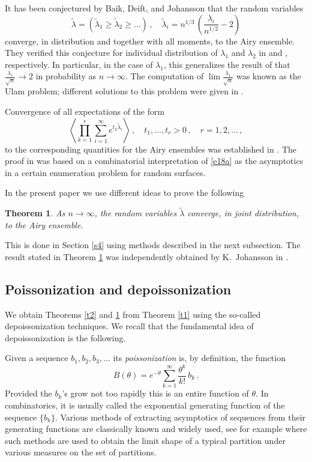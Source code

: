 \documentclass[12pt]{amsart}
\newcommand{\la}{\lambda}
\newcommand{\ix}{\theta}
\theoremstyle{plain}
\newtheorem{theorem}{Theorem}
\theoremstyle{definition}
\numberwithin{equation}{section}
\begin{document}
It has been conjectured by
Baik, Deift, and Johansson that 
the random variables
%
\begin{equation*}
\widetilde{\la}=
\left(\widetilde{\la}_1 \ge \widetilde{\la}_2 \ge \dots
\right)\,,
\quad 
\widetilde{\la}_i =
n^{1/3} \, \left(
\frac{\la_i}{n^{1/2}}-2 \right) 
\end{equation*}
%
converge, in distribution and together with all moments,
to the Airy ensemble. They verified this
conjecture for individual distribution of $\la_1$ and 
$\la_2$ in \cite{BDJ1} and \cite{BDJ2}, respectively. 
In particular, in the case of $\la_1$, this generalizes the
result of  \cite{VK1,VK2} that $\frac{\la_1}{\sqrt n} \to 2$
in probability as $n\to\infty$. The computation of $\lim \frac{\la_1}{\sqrt n}$ was
known as the Ulam problem;  different  solutions to this problem were
given in \cite{AD,J,S}. 


Convergence of all expectations
of the form
%
\begin{equation}\label{e18a}
\left\langle
\prod_{k=1}^r 
\sum_{i=1}^\infty e^{t_k \widetilde{\la}_i}
\right\rangle\,,
\quad t_1,\dots,t_r>0\,, 
\quad r=1,2,\dots\,,
\end{equation}
%
to the corresponding quantities 
for the Airy ensembles was established in \cite{O}. The proof 
in \cite{O} was based on a combinatorial interpretation of
\eqref{e18a} as the asymptotics in a certain enumeration problem
for random surfaces. 

In the present paper we use different ideas to prove the following 

\begin{theorem} \label{t3}  As $n\to\infty$, the random 
variables $\widetilde{\la}$ 
converge, in joint distribution, to the Airy ensemble.
\end{theorem}

This is done in Section \ref{s4} using methods described in the next
subsection. The result stated in Theorem \ref{t3} was
independently obtained by K.~Johansson in \cite{J2}. 

\subsection{Poissonization and depoissonization}\label{s15}

We obtain Theorems \ref{t2} and \ref{t3} from Theorem \ref{t1} using the
so-called depoissonization techniques. We recall that  the fundamental idea of 
depoissonization is the following. 

Given a sequence $b_1,b_2,b_3,\dots$ its {\em poissonization}
is, by definition, the function
%
\begin{equation}\label{e18}
B(\ix)=e^{-\ix} \sum_{k=1}^\infty \frac{\ix^k}{k!}\, b_k \,. 
\end{equation}
%
Provided the $b_k$'s grow not too rapidly 
this is an entire function
of $\theta$. In combinatorics, it is usually called the 
exponential generating function of the sequence $\{b_k\}$.
Various methods of extracting asymptotics of sequences from
their generating functions are classically known and widely
used, see for example \cite{V} where such methods are used
to obtain the limit shape of a typical partition under various
measures on the set of partitions. 
\end{document}
